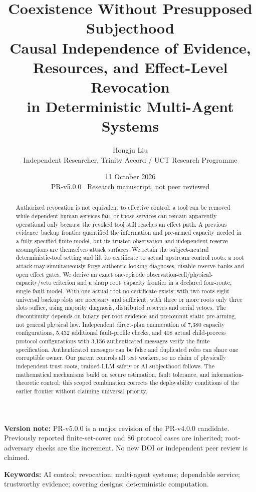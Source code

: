 \documentclass[11pt,a4paper]{article}
\title{\vspace{-1cm}\textbf{Coexistence Without Presupposed Subjecthood}\\[6pt]
\Large Causal Independence of Evidence, Resources, and Effect-Level Revocation\\in Deterministic Multi-Agent Systems}
\author{Hongju Liu\\\normalsize Independent Researcher, Trinity Accord / UCT Research Programme}
\date{11 October 2026\\\small PR-v5.0.0 \textbullet\ Research manuscript, not peer reviewed}
\theoremstyle{definition}\newtheorem{definition}{Definition}
\begin{document}
\maketitle\thispagestyle{plain}
\begin{abstract}
Authorized revocation is not equivalent to effective control: a tool can be removed while dependent human services fail, or those services can remain apparently operational only because the revoked tool still reaches an effect path. A previous evidence--backup frontier quantified the information and pre-armed capacity needed in a fully specified finite model, but its trusted-observation and independent-reserve assumptions are themselves attack surfaces. We retain the subject-neutral deterministic-tool setting and lift its certificate to actual upstream control roots: a root attack may simultaneously forge authentic-looking diagnoses, disable reserve banks and open effect gates. We derive an exact one-episode observation-cell/physical-capacity/veto criterion and a sharp root--capacity frontier in a declared four-route, single-fault model. With one actual root no certificate exists; with two roots eight universal backup slots are necessary and sufficient; with three or more roots only three slots suffice, using majority diagnosis, distributed reserves and serial vetoes. The discontinuity depends on binary per-root evidence and precommit static pre-arming, not general physical law. Independent direct-plan enumeration of 7,380 capacity configurations, 5,432 additional fault-profile checks, and 408 actual child-process protocol configurations with 3,156 authenticated messages verify the finite specification. Authenticated messages can be false and duplicated roles can share one corruptible owner. Our parent controls all test workers, so no claim of physically independent trust roots, trained-LLM safety or AI subjecthood follows. The mathematical mechanisms build on secure estimation, fault tolerance, and information-theoretic control; this scoped combination corrects the deployability conditions of the earlier frontier without claiming universal priority.
\end{abstract}
\noindent\textbf{Version note:} PR-v5.0.0 is a major revision of the PR-v4.0.0 candidate. Previously reported finite-set-cover and 86 protocol cases are inherited; root-adversary checks are the increment. No new DOI or independent peer review is claimed.\par
\noindent\textbf{Keywords:} AI control; revocation; multi-agent systems; dependable service; trustworthy evidence; covering designs; deterministic computation.
\end{document}
